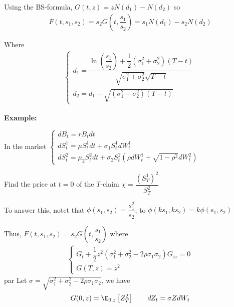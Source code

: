 \noindent Using the BS-formula,  $G(t,z) = zN(d_1)-N(d_2)$ so
\begin{equation*}
  \begin{gathered}
    F(t,s_1,s_2) = s_2G\left(t,\dfrac{s_1}{s_2}\right) = s_1N(d_1)-s_2N(d_2)
  \end{gathered}
\end{equation*}\par
\noindent Where
\begin{equation*}
  \begin{gathered}
    \begin{cases}
      d_1 = \dfrac{\ln{\left(\dfrac{s_1}{s_2}\right)}+\dfrac{1}{2}(\sigma_1^2+\sigma_2^2)(T-t)}{\sqrt{\sigma_1^2+\sigma_2^2}\sqrt{T-t}}\\
      d_2 = d_1-\sqrt{(\sigma_1^2+\sigma_2^2)(T-t)}
    \end{cases}
  \end{gathered}
\end{equation*}
\par\bigskip
\noindent\textbf{Example:}\par
\noindent In the market $\begin{cases}
  dB_t = rB_tdt\\
  dS_t^1=\mu S_t^1dt+\sigma_1S_t^1dW_t^1\\
  dS_t^2=\mu_2S_t^2dt+\sigma_2S_t^2\left(\rho dW_t^1+\sqrt{1-\rho^2}dW_t^2\right)
\end{cases}$\par
\noindent Find the price at $t=0$ of the $T$-claim $\chi = \dfrac{(S_T^1)^2}{S_T^2}$
\par\bigskip
\noindent To answer this, notet that $\phi(s_1,s_2) = \dfrac{s_1^2}{s_2}$, to $\phi(ks_1,ks_2) = k\phi(s_1,s_2)$\par
\noindent Thus, $F(t,s_1,s_2) = s_2G\left(t,\dfrac{s_1}{s_2}\right)$ where
\begin{equation*}
  \begin{gathered}
    \begin{cases}
      G_t+\dfrac{1}{2}z^2\left(\sigma_1^2+\sigma_2^2-2\rho\sigma_1\sigma_2\right)G_{zz} = 0\\
      G(T,z) = z^2
    \end{cases}
  \end{gathered}
\end{equation*}par
\noindent Let $\sigma = \sqrt{\sigma_1^2+\sigma_2^2-2\rho\sigma_1\sigma_2}$, we have
\begin{equation*}
  \begin{gathered}
    G(0,z) = \E_{0,z}\left[Z_T^2\right]\qquad dZ_t = \sigma ZdW_t
  \end{gathered}
\end{equation*}\par
